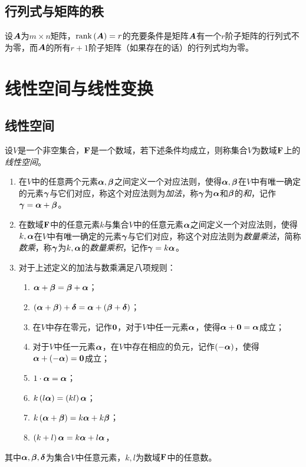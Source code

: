 \documentclass{ctexart}
\begin{document}
\subsection{行列式与矩阵的秩}

\begin{theorem}
    设\(\boldsymbol{A}\)为\(m\times n\)矩阵，\(\mathrm{rank}\left( \boldsymbol{A} \right)=r\)的充要条件是矩阵\(\boldsymbol{A}\)有一个\(r\)阶子矩阵的行列式不为零，而\(\boldsymbol{A}\)的所有\(r+1\)阶子矩阵（如果存在的话）的行列式均为零。
\end{theorem}

\section{线性空间与线性变换}

\subsection{线性空间}

\begin{definition}[线性空间]
    设\(V\)是一个非空集合，\(\boldsymbol{\mathrm{F}}\)是一个数域，若下述条件均成立，则称集合\(V\)为数域\(\boldsymbol{\mathrm{F}}\)上的\emph{线性空间}。
    \begin{enumerate}
        \item 在\(V\)中的任意两个元素\(\boldsymbol{\alpha},\boldsymbol{\beta}\)之间定义一个对应法则，使得\(\boldsymbol{\alpha},\boldsymbol{\beta}\)在\(V\)中有唯一确定的元素\(\boldsymbol{\gamma}\)与它们对应，称这个对应法则为\emph{加法}，称\(\boldsymbol{\gamma}\)为\(\boldsymbol{\alpha}\)和\(\boldsymbol{\beta}\)的\emph{和}，记作\(\boldsymbol{\gamma}=\boldsymbol{\alpha}+\boldsymbol{\beta}\)。
        \item 在数域\(\boldsymbol{\mathrm{F}}\)中的任意元素\(k\)与集合\(V\)中的任意元素\(\boldsymbol{\alpha}\)之间定义一个对应法则，使得\(k,\boldsymbol{\alpha}\)在\(V\)中有唯一确定的元素\(\boldsymbol{\gamma}\)与它们对应，称这个对应法则为\emph{数量乘法}，简称\emph{数乘}，称\(\boldsymbol{\gamma}\)为\(k,\boldsymbol{\alpha}\)的\emph{数量乘积}，记作\(\boldsymbol{\gamma}=k\boldsymbol{\alpha}\)。
        \item 对于上述定义的加法与数乘满足八项规则：\begin{enumerate}
                  \item \(\boldsymbol{\alpha}+\boldsymbol{\beta}=\boldsymbol{\beta}+\boldsymbol{\alpha}\)；
                  \item \(\left( \boldsymbol{\alpha}+\boldsymbol{\beta} \right)+\boldsymbol{\delta}=\boldsymbol{\alpha}+\left( \boldsymbol{\beta}+\boldsymbol{\delta} \right)\)；
                  \item 在\(V\)中存在零元，记作\(\boldsymbol{0}\)，对于\(V\)中任一元素\(\boldsymbol{\alpha}\)，使得\(\boldsymbol{\alpha}+\boldsymbol{0}=\boldsymbol{\alpha}\)成立；
                  \item 对于\(V\)中任一元素\(\boldsymbol{\alpha}\)，在\(V\)中存在相应的负元，记作\(\left( -\boldsymbol{\alpha} \right)\)，使得\(\boldsymbol{\alpha}+\left( -\boldsymbol{\alpha} \right)=\boldsymbol{0}\)成立；
                  \item \(1\cdot\boldsymbol{\alpha}=\boldsymbol{\alpha}\)；
                  \item \(k\left( l\boldsymbol{\alpha} \right)=\left( kl \right)\boldsymbol{\alpha}\)；
                  \item \(k\left( \boldsymbol{\alpha}+\boldsymbol{\beta} \right)=k\boldsymbol{\alpha}+k\boldsymbol{\beta}\)；
                  \item \(\left( k+l \right)\boldsymbol{\alpha}=k\boldsymbol{\alpha}+l\boldsymbol{\alpha}\)，
              \end{enumerate}
    \end{enumerate}
    其中\(\boldsymbol{\alpha},\boldsymbol{\beta},\boldsymbol{\delta}\)为集合\(V\)中任意元素，\(k,l\)为数域\(\boldsymbol{\mathrm{F}}\)中的任意数。
\end{definition}
\end{document}
